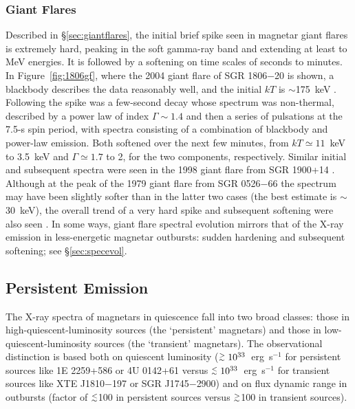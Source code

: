 \subsubsection{Giant Flares}

Described in \S\ref{sec:giantflares}, the initial brief spike seen in magnetar
giant flares is extremely hard, peaking in the soft gamma-ray band and extending
at least to MeV energies. It is
followed by a softening on time scales of seconds to minutes. In
Figure~\ref{fig:1806gf}, where the 2004 giant flare of SGR 1806$-$20 is shown, a blackbody
describes the data reasonably well, and
the initial $kT$ is $\sim$175~keV \citep{hbs+05,bzh+07}.  
Following the spike was a few-second decay whose spectrum was non-thermal, described
by a power law of index $\Gamma \sim 1.4$ and then a series of pulsations at the 7.5-s spin period, with spectra consisting
of a combination of blackbody and power-law emission.  Both softened over the next few minutes,
from $kT \simeq 11$~keV to 3.5~keV and $\Gamma \simeq 1.7$ to 2, for the two components,
respectively.
Similar initial and subsequent spectra were seen in the
1998 giant flare from SGR 1900+14 \citep{hcm+99}.  Although at the peak of the
1979 giant flare from SGR 0526$-$66 the spectrum may have been slightly softer than in the latter
two cases (the best estimate is $\sim$30~keV), 
the overall trend of a very hard spike and subsequent softening were also seen \citep{fek+81}. 
In some ways, giant flare spectral evolution mirrors that of the X-ray emission in less-energetic
magnetar outbursts:  sudden hardening and subsequent softening; see \S\ref{sec:specevol}.  


\subsection{Persistent Emission}
\label{sec:persistentspectra}

The X-ray spectra of magnetars in quiescence fall into two broad classes:
those in high-quiescent-luminosity sources (the `persistent' magnetars)
and those in low-quiescent-luminosity sources (the `transient' magnetars).
The observational distinction is based both on quiescent luminosity ($\gapp 10^{33}$~erg~s$^{-1}$
for persistent sources like 1E 2259+586 or 4U 0142+61 versus
$\lapp 10^{33}$~erg~s$^{-1}$ for transient sources like XTE J1810$-$197 or
SGR J1745$-$2900) and on flux dynamic range in outbursts (factor of $\lapp$100 in persistent
sources versus $\gapp$100 in transient sources).

